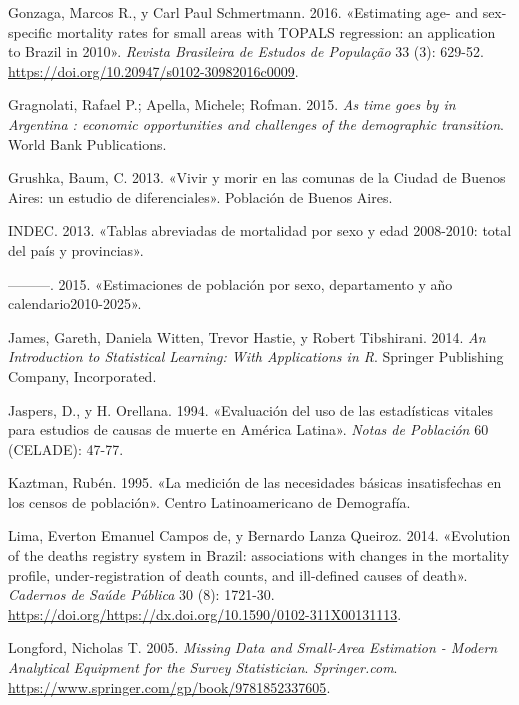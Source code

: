 \documentclass[12pt,spanish,]{article}
\begin{document}
\leavevmode\hypertarget{ref-Gonzaga_Schmertmann_2016}{}%
Gonzaga, Marcos R., y Carl Paul Schmertmann. 2016. «Estimating age- and
sex-specific mortality rates for small areas with TOPALS regression: an
application to Brazil in 2010». \emph{Revista Brasileira de Estudos de
População} 33 (3): 629-52.
\url{https://doi.org/10.20947/s0102-30982016c0009}.

\leavevmode\hypertarget{ref-Gragnolati2015}{}%
Gragnolati, Rafael P.; Apella, Michele; Rofman. 2015. \emph{As time goes
by in Argentina : economic opportunities and challenges of the
demographic transition}. World Bank Publications.

\leavevmode\hypertarget{ref-Grushka2013}{}%
Grushka, Baum, C. 2013. «Vivir y morir en las comunas de la Ciudad de
Buenos Aires: un estudio de diferenciales». Población de Buenos Aires.

\leavevmode\hypertarget{ref-INDEC2013}{}%
INDEC. 2013. «Tablas abreviadas de mortalidad por sexo y edad 2008-2010:
total del país y provincias».

\leavevmode\hypertarget{ref-INDEC2015}{}%
---------. 2015. «Estimaciones de población por sexo, departamento y año
calendario2010-2025».

\leavevmode\hypertarget{ref-James2014}{}%
James, Gareth, Daniela Witten, Trevor Hastie, y Robert Tibshirani. 2014.
\emph{An Introduction to Statistical Learning: With Applications in R}.
Springer Publishing Company, Incorporated.

\leavevmode\hypertarget{ref-JaspersOrellana1994}{}%
Jaspers, D., y H. Orellana. 1994. «Evaluación del uso de las
estadísticas vitales para estudios de causas de muerte en América
Latina». \emph{Notas de Población} 60 (CELADE): 47-77.

\leavevmode\hypertarget{ref-Kaztman1995}{}%
Kaztman, Rubén. 1995. «La medición de las necesidades básicas
insatisfechas en los censos de población». Centro Latinoamericano de
Demografía.

\leavevmode\hypertarget{ref-LimaQueiroz2014}{}%
Lima, Everton Emanuel Campos de, y Bernardo Lanza Queiroz. 2014.
«Evolution of the deaths registry system in Brazil: associations with
changes in the mortality profile, under-registration of death counts,
and ill-defined causes of death». \emph{Cadernos de Saúde Pública} 30
(8): 1721-30.
\url{https://doi.org/https://dx.doi.org/10.1590/0102-311X00131113}.

\leavevmode\hypertarget{ref-Longford2005}{}%
Longford, Nicholas T. 2005. \emph{Missing Data and Small-Area Estimation
- Modern Analytical Equipment for the Survey Statistician}.
\emph{Springer.com}.
\url{https://www.springer.com/gp/book/9781852337605}.
\end{document}
